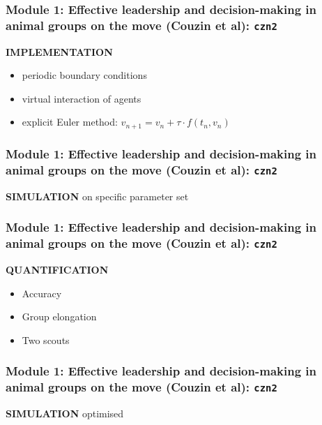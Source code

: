 \documentclass[compress]{beamer}
\begin{document}
\begin{frame}
	\frametitle{Module 1: Effective leadership and decision-making in animal groups on the move (Couzin et al): \texttt{czn2}}
	
	\textbf{IMPLEMENTATION} 
	
	\hspace{1}
	
	\begin{itemize}
		\item periodic boundary conditions
		\item virtual interaction of agents
		\item explicit Euler method: \( v_{n+1}= v_{n} + \tau \cdot f(t_{n}, v_{n})  \)
	\end{itemize}
	
	
\end{frame}


\begin{frame}
	\frametitle{Module 1: Effective leadership and decision-making in animal groups on the move (Couzin et al): \texttt{czn2}}
	
	\textbf{SIMULATION} on specific parameter set 
	
	
\end{frame}


\begin{frame}
	\frametitle{Module 1: Effective leadership and decision-making in animal groups on the move (Couzin et al): \texttt{czn2}}
	
	\textbf{QUANTIFICATION} 

	\hspace{1}
	
	\begin{itemize}
		\item Accuracy
		\item Group elongation
		\item Two scouts
	\end{itemize}
	
	
\end{frame}


\begin{frame}
	\frametitle{Module 1: Effective leadership and decision-making in animal groups on the move (Couzin et al): \texttt{czn2}}
	
	\textbf{SIMULATION} optimised
	
\end{frame}


%	
%	
\end{document}
